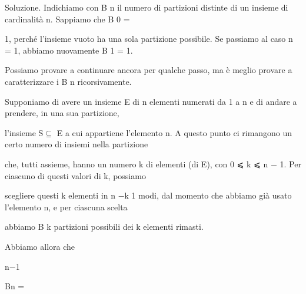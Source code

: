 \documentclass[a4paper,portrait,12pt]{article}
\begin{document}
\begin{flushleft}
Soluzione. Indichiamo con B n il numero di partizioni distinte di un insieme di cardinalit\`{a} n. Sappiamo che B 0 =
\end{flushleft}


\begin{flushleft}
1, perch\'{e} l'insieme vuoto ha una sola partizione possibile. Se passiamo al caso n = 1, abbiamo nuovamente B 1 = 1.
\end{flushleft}


\begin{flushleft}
Possiamo provare a continuare ancora per qualche passo, ma \`{e} meglio provare a caratterizzare i B n ricorsivamente.
\end{flushleft}


\begin{flushleft}
Supponiamo di avere un insieme E di n elementi numerati da 1 a n e di andare a prendere, in una sua partizione,
\end{flushleft}


\begin{flushleft}
l'insieme S$\subseteq$ E a cui appartiene l'elemento n. A questo punto ci rimangono un certo numero di insiemi nella partizione
\end{flushleft}


\begin{flushleft}
che, tutti assieme, hanno un numero k di elementi (di E), con 0 ⩽ k ⩽ n $-$ 1. Per ciascuno di questi valori di k, possiamo
\end{flushleft}


\begin{flushleft}
scegliere questi k elementi in n $-$k 1 modi, dal momento che abbiamo gi\`{a} usato l'elemento n, e per ciascuna scelta
\end{flushleft}


\begin{flushleft}
abbiamo B k partizioni possibili dei k elementi rimasti.
\end{flushleft}


\begin{flushleft}
Abbiamo allora che
\end{flushleft}


\begin{flushleft}
n$-$1
\end{flushleft}





\begin{flushleft}
Bn =
\end{flushleft}
\end{document}
